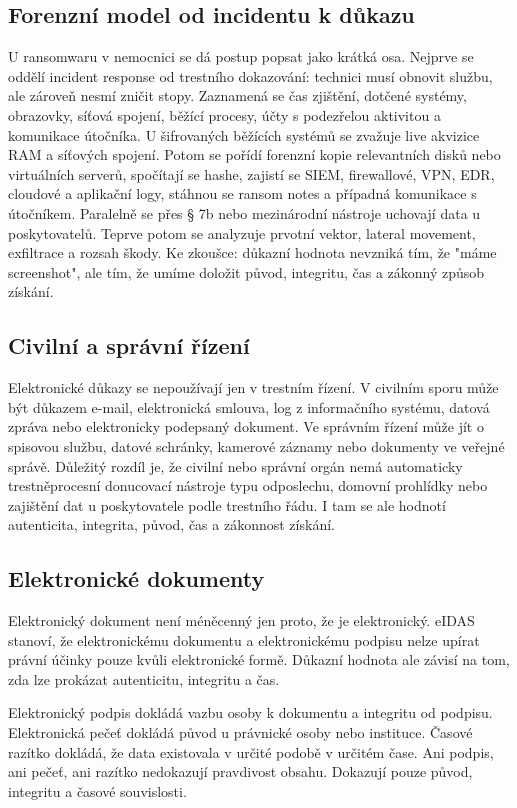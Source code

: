 \documentclass[11pt,a4paper]{article}
\begin{document}
\subsection*{Forenzní model od incidentu k důkazu}
U ransomwaru v nemocnici se dá postup popsat jako krátká osa. Nejprve se oddělí incident response od trestního dokazování: technici musí obnovit službu, ale zároveň nesmí zničit stopy. Zaznamená se čas zjištění, dotčené systémy, obrazovky, síťová spojení, běžící procesy, účty s podezřelou aktivitou a komunikace útočníka. U šifrovaných běžících systémů se zvažuje live akvizice RAM a síťových spojení. Potom se pořídí forenzní kopie relevantních disků nebo virtuálních serverů, spočítají se hashe, zajistí se SIEM, firewallové, VPN, EDR, cloudové a aplikační logy, stáhnou se ransom notes a případná komunikace s útočníkem. Paralelně se přes § 7b nebo mezinárodní nástroje uchovají data u poskytovatelů. Teprve potom se analyzuje prvotní vektor, lateral movement, exfiltrace a rozsah škody. Ke zkoušce: důkazní hodnota nevzniká tím, že "máme screenshot", ale tím, že umíme doložit původ, integritu, čas a zákonný způsob získání.

\subsection*{Civilní a správní řízení}
Elektronické důkazy se nepoužívají jen v trestním řízení. V civilním sporu může být důkazem e-mail, elektronická smlouva, log z informačního systému, datová zpráva nebo elektronicky podepsaný dokument. Ve správním řízení může jít o spisovou službu, datové schránky, kamerové záznamy nebo dokumenty ve veřejné správě. Důležitý rozdíl je, že civilní nebo správní orgán nemá automaticky trestněprocesní donucovací nástroje typu odposlechu, domovní prohlídky nebo zajištění dat u poskytovatele podle trestního řádu. I tam se ale hodnotí autenticita, integrita, původ, čas a zákonnost získání.

\subsection*{Elektronické dokumenty}
Elektronický dokument není méněcenný jen proto, že je elektronický. eIDAS stanoví, že elektronickému dokumentu a elektronickému podpisu nelze upírat právní účinky pouze kvůli elektronické formě. Důkazní hodnota ale závisí na tom, zda lze prokázat autenticitu, integritu a čas.

Elektronický podpis dokládá vazbu osoby k dokumentu a integritu od podpisu. Elektronická pečeť dokládá původ u právnické osoby nebo instituce. Časové razítko dokládá, že data existovala v určité podobě v určitém čase. Ani podpis, ani pečeť, ani razítko nedokazují pravdivost obsahu. Dokazují pouze původ, integritu a časové souvislosti.
\end{document}
